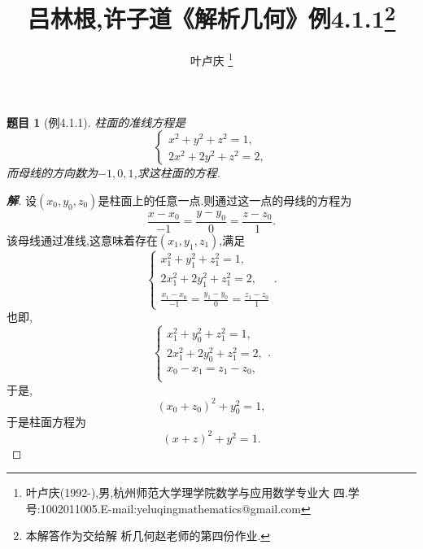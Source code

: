 ﻿\documentclass[a4paper]{article}
\newtheorem*{exe}{题目}
\newenvironment{exercise}
{\bigskip\begin{mdframed}\begin{exe}}
    {\end{exe}\end{mdframed}\bigskip}
\numberwithin{equation}{section}
\begin{document}
\title{{\bf{吕林根,许子道《解析几何》例4.1.1\footnote{本解答作为交给解
        析几何赵老师的第四份作业.}}}} \author{\small{叶卢庆
    \footnote{叶卢庆(1992-),男,杭州师范大学理学院数学与应用数学专业大
      四.学号:1002011005.E-mail:yeluqingmathematics@gmail.com}}}
\maketitle
\begin{exercise}[例4.1.1]
柱面的准线方程是
$$
\begin{cases}
  x^2+y^2+z^2=1,\\
2x^2+2y^2+z^2=2,
\end{cases}
$$
而母线的方向数为$-1,0,1$,求这柱面的方程.
\end{exercise}
\begin{proof}[\textbf{解}]
设$(x_0,y_0,z_0)$是柱面上的任意一点.则通过这一点的母线的方程为
$$
\frac{x-x_0}{-1}=\frac{y-y_0}{0}=\frac{z-z_0}{1}.
$$
该母线通过准线,这意味着存在$(x_1,y_1,z_1)$,满足
$$
\begin{cases}
  x_{1}^2+y_{1}^2+z_{1}^2=1,\\
2x_{1}^2+2y_{1}^2+z_{1}^2=2,\\
\frac{x_{1}-x_0}{-1}=\frac{y_{1}-y_0}{0}=\frac{z_{1}-z_0}{1}
\end{cases}.
$$
也即,
$$
\begin{cases}
  x_{1}^2+y_{0}^2+z_{1}^2=1,\\
2x_{1}^2+2y_{0}^2+z_{1}^2=2,\\
x_0-x_1=z_1-z_0,\\
\end{cases}.
$$
于是,
$$
(x_0+z_{0})^2+y_{0}^2=1,
$$
于是柱面方程为
$$
(x+z)^2+y^2=1.
$$
\end{proof}
\end{document}
